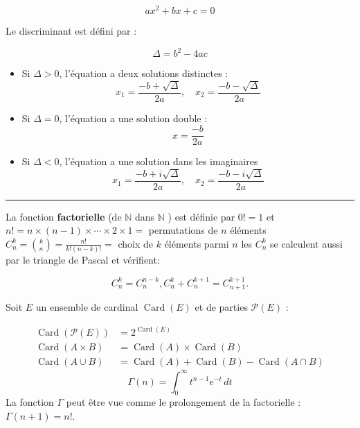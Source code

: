 \begin{f}  
     \[
    ax^2 + bx + c = 0
    \]

    Le discriminant est défini par :
    
    \[
    \Delta = b^2 - 4ac
    \]
       
    \begin{itemize}
        \item Si \(\Delta > 0\), l'équation a deux solutions distinctes :
        \[
        x_1 = \frac{-b + \sqrt{\Delta}}{2a}, \quad x_2 = \frac{-b - \sqrt{\Delta}}{2a}
        \]
        \item Si \(\Delta = 0\), l'équation a une solution double :
        \[
        x = \frac{-b}{2a}
        \]
        \item Si \(\Delta < 0\), l'équation a une solution dans les imaginaires
        \[
        x_1 = \frac{-b + i\sqrt{\Delta}}{2a}, \quad x_2 = \frac{-b - i\sqrt{\Delta}}{2a}
        \]
    \end{itemize}
\end{f}
\hrule
\begin{f}  

La fonction \textbf{factorielle} (de \(\mathbb{N}\) dans \(\mathbb{N}\) ) est définie par \(0!=1\) et \(n!=n \times(n-1) \times \cdots \times 2 \times 1=\) permutations de \(n\) éléments \(\displaystyle C_n^k=\binom{k}{n}=\frac{n!}{k!(n-k)!}=\) choix de \(k\) éléments parmi \(n\) les \(C_n^k\) se calculent aussi par le triangle de Pascal et vérifient:

\[
C_n^k=C_n^{n-k}, C_n^k+C_n^{k+1}=C_{n+1}^{k+1} .
\]


Soit \(E\) un ensemble de cardinal \(\operatorname{Card}(E)\) et de parties \(\mathcal{P}(E)\) :

\[
\begin{aligned}
\operatorname{Card}(\mathcal{P}(E)) & =2^{\operatorname{Card}(E)} \\
\operatorname{Card}(A \times B) & =\operatorname{Card}(A) \times \operatorname{Card}(B) \\
\operatorname{Card}(A \cup B) & =\operatorname{Card}(A)+\operatorname{Card}(B)-\operatorname{Card}(A \cap B)
\end{aligned}
\]
\[ \Gamma(n) = \int_0^\infty t^{n-1} e^{-t} \, dt \]
La fonction \(\Gamma\) peut être vue comme le prolongement de la factorielle : \(\Gamma(n+1)=n!\).
\end{f}

